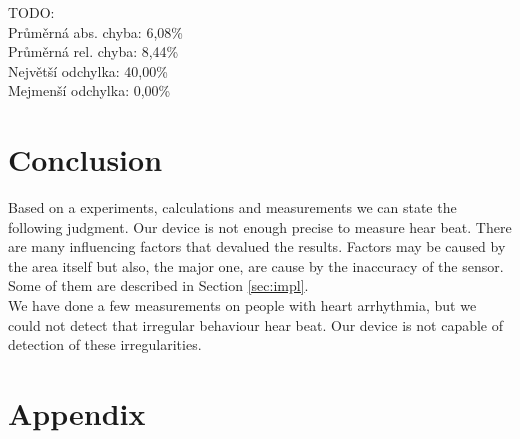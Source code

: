 \documentclass[11pt,a4paper]{article}
\begin{document}
TODO:\\
Průměrná abs. chyba: 6,08\%\\
Průměrná rel. chyba: 8,44\%\\
Největší odchylka: 40,00\%\\
Mejmenší odchylka: 0,00\%

\section{Conclusion}
Based on a experiments, calculations and measurements we can state the following judgment. Our device is not enough precise to measure hear beat. There are many influencing factors that devalued the results. Factors may be caused by the area itself but also, the major one, are cause by the inaccuracy of the sensor. Some of them are described in Section \ref{sec:impl}.\\

We have done a few measurements on people with heart arrhythmia, but we could not detect that irregular behaviour hear beat. Our device is not capable of detection of these irregularities.


\newpage %

\section{Appendix}
\end{document}
